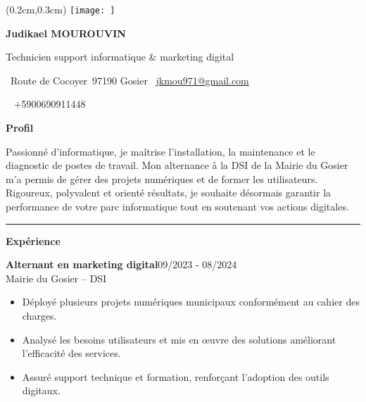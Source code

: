 \documentclass[a4paper]{article}
\renewcommand{\colorbox}[2]{#2}%
\newcommand{\fullrule}{\hspace{-1.5cm}\rule{\paperwidth}{0.4pt}}
\newcommand{\cvsection}[1]{%
  \vspace{6pt}\textbf{\Large #1}\par\vspace{2pt}}
\begin{document}
\color{white}
\ifx\relax\relax\else
\begin{textblock*}{4cm}(0.2cm,0.3cm)
  \texttt{[image: ]}
\end{textblock*}
 \fi
\begin{center}
  {\fontsize{44pt}{24pt}\selectfont\bfseries Judikael MOUROUVIN}

  \bigskip
  {\Large Technicien support informatique \& marketing digital}

  \bigskip\bigskip
  \faMapMarker~Route de Cocoyer\ 97190 Gosier
  \quad\faEnvelope~\href{mailto:jkmou971@gmail.com}{jkmou971@gmail.com}

  \bigskip
  \faPhone~ +5900690911448
  \quad \faLinkedin\ \href{}{}
 

  \vspace{-0.3cm}
  
\end{center}
\cvsection{Profil}

Passionné d’informatique, je maîtrise l’installation, la maintenance et le diagnostic de postes de travail. Mon alternance à la DSI de la Mairie du Gosier m’a permis de gérer des projets numériques et de former les utilisateurs. Rigoureux, polyvalent et orienté résultats, je souhaite désormais garantir la performance de votre parc informatique tout en soutenant vos actions digitales.

\medskip\fullrule

\cvsection{Expérience}
\colorbox{maincolor}{%
  \begin{minipage}{\linewidth}
    \noindent
    \textbf{Alternant en marketing digital}\hfill 09/2023 - 08/2024\\
    Mairie du Gosier – DSI\\[-0.3em]
    \begin{itemize}[leftmargin=*]
      \item Déployé plusieurs projets numériques municipaux conformément au cahier des charges. \item Analysé les besoins utilisateurs et mis en œuvre des solutions améliorant l’efficacité des services. \item Assuré support technique et formation, renforçant l’adoption des outils digitaux.
    \end{itemize}
  \end{minipage}}
\end{document}
